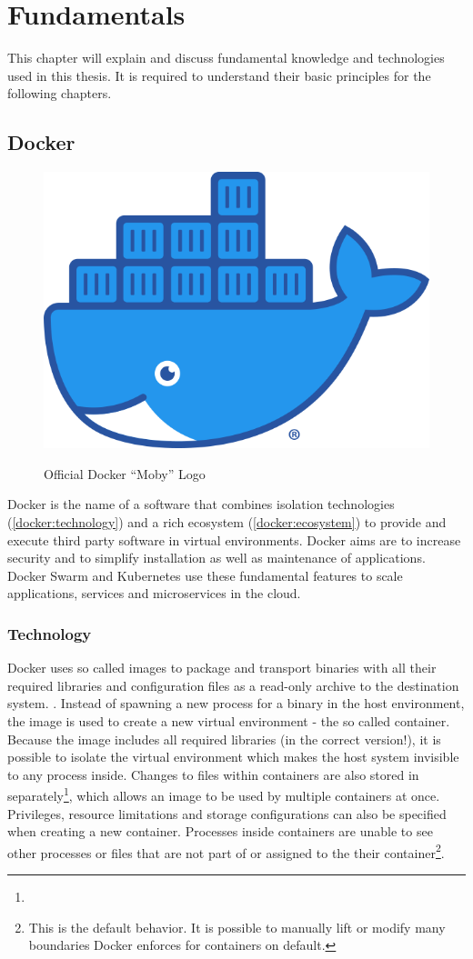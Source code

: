 \chapter{Fundamentals}

This chapter will explain and discuss fundamental knowledge and technologies used in this thesis.
It is required to understand their basic principles for the following chapters.

\section{Docker}
\label{docker:image}

\begin{figure}
	\centering
	\includegraphics[width=.2\textwidth]{res/docker-Moby-logo.png}
	\label{docker:logo}
	\caption{Official Docker \enquote{Moby} Logo\cite{docker:logo}}
	\vspace{1cm}
\end{figure}

Docker is the name of a software that combines isolation technologies (\autoref{docker:technology}) and a rich ecosystem (\autoref{docker:ecosystem}) to provide and execute third party software in virtual environments.
Docker aims are to increase security and to simplify installation as well as maintenance of applications.
Docker Swarm\cite{docker:swarm:key-concepts} and Kubernetes\cite{kubernetes:overview} use these fundamental features to scale applications, services and microservices in the cloud.


\subsection{Technology}
\label{docker:technology}

Docker uses so called images to package and transport binaries with all their required libraries and configuration files as a read-only archive to the destination system.
.
Instead of spawning a new process for a binary in the host environment, the image is used to create a new virtual environment - the so called container.
Because the image includes all required libraries (in the correct version!), it is possible to isolate the virtual environment which makes the host system invisible to any process inside.
Changes to files within containers are also stored in separately\footnote{}, which allows an image to be used by multiple containers at once.
Privileges, resource limitations and storage configurations can also be specified when creating a new container.
Processes inside containers are unable to see  other processes or files that are not part of or assigned to the their container\footnote{This is the default behavior. It is possible to manually lift or modify many boundaries Docker enforces for containers on default.}.

